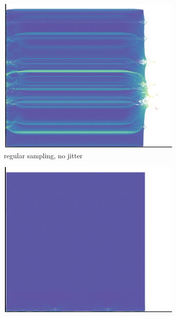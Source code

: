 \newpage
\begin{figure}[H]
  \centering
  \begin{subfigure}[t]{0.49\textwidth}
    \centering
    \includegraphics*[width=\textwidth]{images/initial/csqr_0_02s.jpg}
    \caption{regular sampling, no jitter}
  \end{subfigure}
  \begin{subfigure}[t]{0.49\textwidth}
    \centering
    \includegraphics*[width=\textwidth]{images/initial/csqr_0_02s_jit.jpg}

\end{subfigure}
\end{figure}
